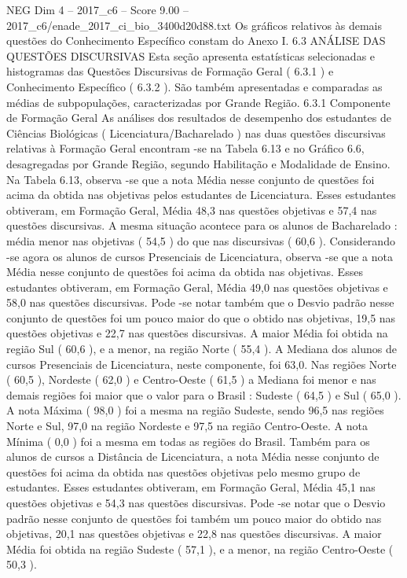 \begin{textsample}{NEG Dim 4 – 2017\_c6 – Score 9.00 – 2017\_c6/enade\_2017\_ci\_bio\_3400d20d88.txt}
Os gráficos relativos às demais questões do Conhecimento Específico constam do Anexo I. 6.3 ANÁLISE DAS QUESTÕES DISCURSIVAS Esta seção apresenta estatísticas selecionadas e histogramas das Questões Discursivas de Formação Geral ( 6.3.1 ) e Conhecimento Específico ( 6.3.2 ).
São também apresentadas e comparadas as médias de subpopulações, caracterizadas por Grande Região. 6.3.1 Componente de Formação Geral As análises dos resultados de desempenho dos estudantes de Ciências Biológicas ( Licenciatura/Bacharelado ) nas duas questões discursivas relativas à Formação Geral encontram -se na Tabela 6.13 e no Gráfico 6.6, desagregadas por Grande Região, segundo Habilitação e Modalidade de Ensino.
Na Tabela 6.13, observa -se que a nota Média nesse conjunto de questões foi acima da obtida nas objetivas pelos estudantes de Licenciatura.
Esses estudantes obtiveram, em Formação Geral, Média 48,3 nas questões objetivas e 57,4 nas questões discursivas.
A mesma situação acontece para os alunos de Bacharelado : média menor nas objetivas ( 54,5 ) do que nas discursivas ( 60,6 ).
Considerando -se agora os alunos de cursos Presenciais de Licenciatura, observa -se que a nota Média nesse conjunto de questões foi acima da obtida nas objetivas.
Esses estudantes obtiveram, em Formação Geral, Média 49,0 nas questões objetivas e 58,0 nas questões discursivas.
Pode -se notar também que o Desvio padrão nesse conjunto de questões foi um pouco maior do que o obtido nas objetivas, 19,5 nas questões objetivas e 22,7 nas questões discursivas.
A maior Média foi obtida na região Sul ( 60,6 ), e a menor, na região Norte ( 55,4 ).
A Mediana dos alunos de cursos Presenciais de Licenciatura, neste componente, foi 63,0.
Nas regiões Norte ( 60,5 ), Nordeste ( 62,0 ) e Centro-Oeste ( 61,5 ) a Mediana foi menor e nas demais regiões foi maior que o valor para o Brasil : Sudeste ( 64,5 ) e Sul ( 65,0 ).
A nota Máxima ( 98,0 ) foi a mesma na região Sudeste, sendo 96,5 nas regiões Norte e Sul, 97,0 na região Nordeste e 97,5 na região Centro-Oeste.
A nota Mínima ( 0,0 ) foi a mesma em todas as regiões do Brasil.
Também para os alunos de cursos a Distância de Licenciatura, a nota Média nesse conjunto de questões foi acima da obtida nas questões objetivas pelo mesmo grupo de estudantes.
Esses estudantes obtiveram, em Formação Geral, Média 45,1 nas questões objetivas e 54,3 nas questões discursivas.
Pode -se notar que o Desvio padrão nesse conjunto de questões foi também um pouco maior do obtido nas objetivas, 20,1 nas questões objetivas e 22,8 nas questões discursivas.
A maior Média foi obtida na região Sudeste ( 57,1 ), e a menor, na região Centro-Oeste ( 50,3 ).

\end{textsample}
